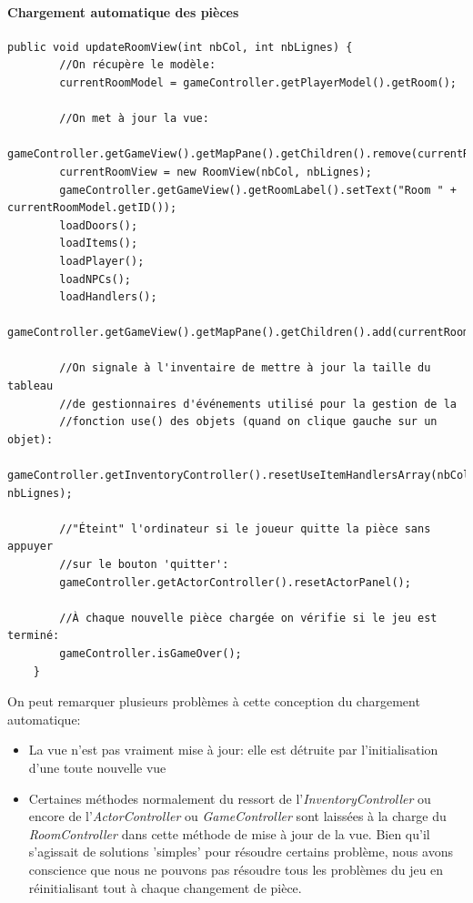 \documentclass[./standalone.tex]{subfiles}
\begin{document}
\paragraph{Chargement automatique des pièces\\}
\noindent
\begin{lstlisting}[style=Java, caption={Méthode de mise à jour de la vue des pièces extraite du \textit{RoomController}}]
    public void updateRoomView(int nbCol, int nbLignes) {
        //On récupère le modèle:
        currentRoomModel = gameController.getPlayerModel().getRoom();

        //On met à jour la vue:
        gameController.getGameView().getMapPane().getChildren().remove(currentRoomView);
        currentRoomView = new RoomView(nbCol, nbLignes);
        gameController.getGameView().getRoomLabel().setText("Room " + currentRoomModel.getID());
        loadDoors();
        loadItems();
        loadPlayer();
        loadNPCs();
        loadHandlers();
        gameController.getGameView().getMapPane().getChildren().add(currentRoomView);

        //On signale à l'inventaire de mettre à jour la taille du tableau 
        //de gestionnaires d'événements utilisé pour la gestion de la
        //fonction use() des objets (quand on clique gauche sur un objet):
        gameController.getInventoryController().resetUseItemHandlersArray(nbCol, nbLignes);

        //"Éteint" l'ordinateur si le joueur quitte la pièce sans appuyer 
        //sur le bouton 'quitter':
        gameController.getActorController().resetActorPanel();

        //À chaque nouvelle pièce chargée on vérifie si le jeu est terminé:
        gameController.isGameOver();
    }
\end{lstlisting}
\newpage
On peut remarquer plusieurs problèmes à cette conception du chargement automatique:

\begin{itemize}
	\item La vue n'est pas vraiment mise à jour: elle est détruite par l'initialisation d'une toute nouvelle vue
	\item Certaines méthodes normalement du ressort de l'\textit{InventoryController} ou encore de l'\textit{ActorController} ou \textit{GameController} sont laissées à la charge du \textit{RoomController} dans cette méthode de mise à jour de la vue. Bien qu'il s'agissait de solutions 'simples' pour résoudre certains problème, nous avons conscience que nous ne pouvons pas résoudre tous les problèmes du jeu en réinitialisant tout à chaque changement de pièce.
\end{itemize}
\end{document}
